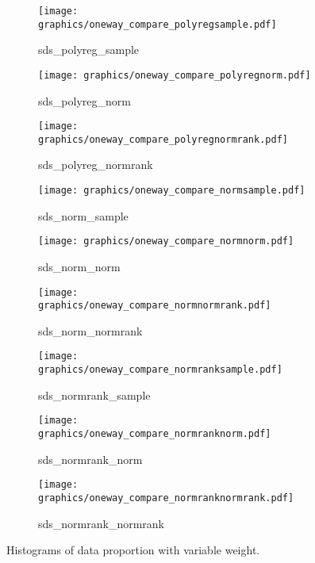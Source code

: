 \newpage
\begin{figure}[H]\ContinuedFloat
    \begin{subfigure}{0.32\textwidth}
        \centering
        \texttt{[image: graphics/oneway\_compare\_polyregsample.pdf]}  
        \caption{sds\_polyreg\_sample}
        \label{subfig:polyregsample}
    \end{subfigure}
    \begin{subfigure}{0.32\textwidth}
        \centering
        \texttt{[image: graphics/oneway\_compare\_polyregnorm.pdf]}  
        \caption{sds\_polyreg\_norm}
        \label{subfig:polyregnorm}
    \end{subfigure}
    \begin{subfigure}{0.32\textwidth}
        \centering
        \texttt{[image: graphics/oneway\_compare\_polyregnormrank.pdf]}  
        \caption{sds\_polyreg\_normrank}
        \label{subfig:polyregnormrank}
    \end{subfigure}
    \medskip
    \begin{subfigure}{0.32\textwidth}
        \centering
        \texttt{[image: graphics/oneway\_compare\_normsample.pdf]}  
        \caption{sds\_norm\_sample}
        \label{subfig:normsample}
    \end{subfigure}
    \begin{subfigure}{0.32\textwidth}
        \centering
        \texttt{[image: graphics/oneway\_compare\_normnorm.pdf]}  
        \caption{sds\_norm\_norm}
        \label{subfig:normnorm}
    \end{subfigure}
    \begin{subfigure}{0.32\textwidth}
        \centering
        \texttt{[image: graphics/oneway\_compare\_normnormrank.pdf]}  
        \caption{sds\_norm\_normrank}
        \label{subfig:normnormrank}
    \end{subfigure}
    \medskip
    \begin{subfigure}{0.32\textwidth}
        \centering
        \texttt{[image: graphics/oneway\_compare\_normranksample.pdf]}  
        \caption{sds\_normrank\_sample}
        \label{subfig:normranksample}
    \end{subfigure}
    \begin{subfigure}{0.32\textwidth}
        \centering
        \texttt{[image: graphics/oneway\_compare\_normranknorm.pdf]}  
        \caption{sds\_normrank\_norm}
        \label{subfig:normranknorm}
    \end{subfigure}
    \begin{subfigure}{0.32\textwidth}
        \centering
        \texttt{[image: graphics/oneway\_compare\_normranknormrank.pdf]}  
        \caption{sds\_normrank\_normrank}
        \label{subfig:normranknormrank}
    \end{subfigure}
    \caption[]{Histograms of data proportion with variable weight.}
\end{figure}

